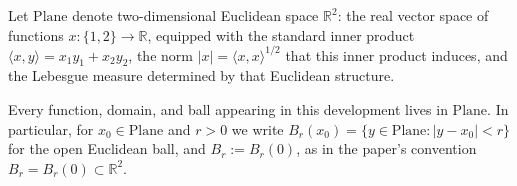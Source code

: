 \begin{definition}
Let $\mathrm{Plane}$ denote two-dimensional Euclidean space $\mathbb{R}^2$: the real vector
space of functions $x\colon\{1,2\}\to\mathbb{R}$, equipped with the standard inner product
$\langle x,y\rangle=x_1y_1+x_2y_2$, the norm $\lvert x\rvert=\langle x,x\rangle^{1/2}$ that
this inner product induces, and the Lebesgue measure determined by that Euclidean structure.

Every function, domain, and ball appearing in this development lives in $\mathrm{Plane}$.
In particular, for $x_0\in\mathrm{Plane}$ and $r>0$ we write
$B_r(x_0)=\{y\in\mathrm{Plane}:\lvert y-x_0\rvert<r\}$ for the open Euclidean ball, and
$B_r:=B_r(0)$, as in the paper's convention $B_r=B_r(0)\subset\mathbb{R}^2$.
\end{definition}
